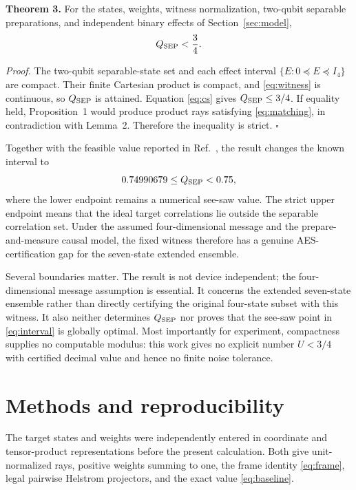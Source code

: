 \documentclass[11pt]{article}
\begin{document}
\textbf{Theorem 3.}
For the states, weights, witness normalization, two-qubit separable
preparations, and independent binary effects of Section~\ref{sec:model},
\begin{equation}
 Q_{\rm SEP}<\frac34.
\end{equation}

\emph{Proof.}
The two-qubit separable-state set and each effect interval
$\{E:0\preceq E\preceq I_4\}$ are compact.  Their finite Cartesian product is
compact, and \eqref{eq:witness} is continuous, so $Q_{\rm SEP}$ is attained.
Equation \eqref{eq:cs} gives $Q_{\rm SEP}\leq3/4$.  If equality held,
Proposition~1 would produce product rays satisfying \eqref{eq:matching}, in
contradiction with Lemma~2.  Therefore the inequality is strict.
\hfill$\square$

Together with the feasible value reported in Ref.~\cite{Patra2026}, the
result changes the known interval to
\begin{equation}
  0.74990679\leq Q_{\rm SEP}<0.75,                        \label{eq:interval}
\end{equation}
where the lower endpoint remains a numerical see-saw value.  The strict upper
endpoint means that the ideal target correlations lie outside the separable
correlation set.  Under the assumed four-dimensional message and the
prepare-and-measure causal model, the fixed witness therefore has a genuine
AES-certification gap for the seven-state extended ensemble.

Several boundaries matter.  The result is not device independent; the
four-dimensional message assumption is essential.  It concerns the extended
seven-state ensemble rather than directly certifying the original four-state
subset with this witness.  It also neither determines $Q_{\rm SEP}$ nor proves
that the see-saw point in \eqref{eq:interval} is globally optimal.  Most
importantly for experiment, compactness supplies no computable modulus: this
work gives no explicit number $U<3/4$ with certified decimal value and hence no
finite noise tolerance.

\section{Methods and reproducibility}
\label{sec:methods}

The target states and weights were independently entered in coordinate and
tensor-product representations before the present calculation.  Both give
unit-normalized rays, positive weights summing to one, the frame identity
\eqref{eq:frame}, legal pairwise Helstrom projectors, and the exact value
\eqref{eq:baseline}.
\end{document}
